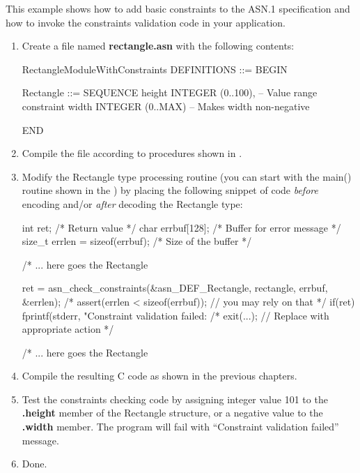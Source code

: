 \documentclass[english,oneside,12pt]{book}
\begin{document}
This example shows how to add basic constraints to the ASN.1 specification
and how to invoke the constraints validation code in your application.
\begin{enumerate}

\item Create a file named \textbf{rectangle.asn} with the following contents:

\begin{asn}
RectangleModuleWithConstraints DEFINITIONS ::= BEGIN

Rectangle ::= SEQUENCE {
    height  INTEGER (0..100), -- Value range constraint
    width   INTEGER (0..MAX)  -- Makes width non-negative 
}

END
\end{asn}

\item Compile the file according to procedures shown in .
\item Modify the Rectangle type processing routine (you can start with the
main() routine shown in the )
by placing the following snippet of code \emph{before} encoding and/or
\emph{after} decoding the Rectangle type:

\begin{example}
int ret;           /* Return value */
char errbuf[128];  /* Buffer for error message */
size_t errlen = sizeof(errbuf);  /* Size of the buffer */

/* ... here goes the Rectangle %

ret = asn_check_constraints(&asn_DEF_Rectangle, rectangle, errbuf, &errlen);
/* assert(errlen < sizeof(errbuf)); // you may rely on that */
if(ret) {
    fprintf(stderr, "Constraint validation failed: %
    /* exit(...); // Replace with appropriate action */
 }

/* ... here goes the Rectangle %
\end{example}
\item Compile the resulting C code as shown in the previous chapters.
\item Test the constraints checking code by assigning integer value
101 to the \textbf{.height} member of the Rectangle structure, or
a negative value to the \textbf{.width} member.
The program will fail with ``Constraint validation failed'' message.
\item Done.
\end{enumerate}
\end{document}

